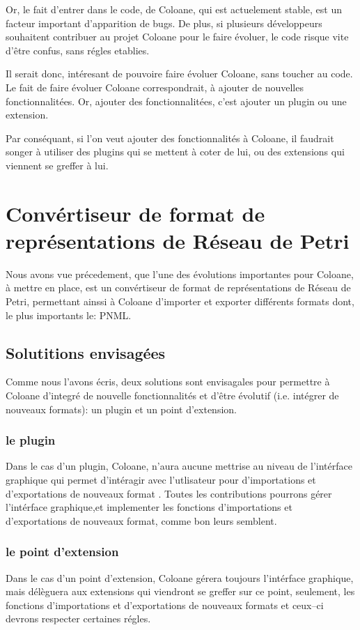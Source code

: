 \documentclass{article}
\begin{document}
Or, le fait d'entrer dans le code, de Coloane, qui est actuelement stable, est 
un facteur important d'apparition de bugs. De plus, si plusieurs développeurs 
souhaitent contribuer au projet Coloane pour le faire évoluer, le code risque 
vite d'être confus, sans régles etablies.

Il serait donc, intéresant de pouvoire faire évoluer Coloane, sans toucher 
au code. Le fait de faire évoluer Coloane correspondrait, à ajouter de 
nouvelles fonctionnalitées. Or, ajouter des fonctionnalitées, c'est ajouter un 
plugin ou une extension.

Par conséquant, si l'on veut ajouter des fonctionnalités à Coloane, il faudrait 
songer à utiliser des plugins qui se mettent à coter de lui, ou des extensions 
qui viennent se greffer à lui.

\newpage

\section{Convértiseur de format de représentations de Réseau de Petri}
Nous avons vue précedement, que l'une des évolutions importantes pour 
Coloane, à mettre en place, est un convértiseur de format de représentations de 
Réseau de Petri, permettant ainssi à Coloane d'importer et exporter différents 
formats dont, le plus importants le: PNML.

\subsection{Solutitions envisagées}
Comme nous l'avons écris, deux solutions sont envisagales pour permettre à 
Coloane d'integré de nouvelle fonctionnalités et d'être évolutif (i.e. intégrer 
de nouveaux formats): un plugin et un point d'extension.

\subsubsection{le plugin}
Dans le cas d'un plugin, Coloane, n'aura aucune mettrise au niveau de 
l'intérface graphique qui permet d'intéragir avec l'utlisateur pour 
d'importations et d'exportations de nouveaux format . Toutes les contributions 
pourrons gérer l'intérface graphique,et implementer les fonctions d'importations 
et d'exportations de nouveaux format, comme bon leurs semblent.

\subsubsection{le point d'extension}
Dans le cas d'un point d'extension, Coloane gérera toujours l'intérface 
graphique, mais délèguera aux extensions qui viendront se greffer sur ce point, 
seulement, les fonctions d'importations et d'exportations de nouveaux formats et 
ceux--ci devrons respecter certaines régles.
\end{document}
